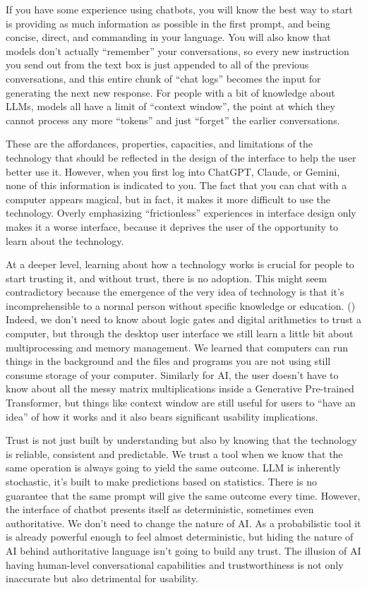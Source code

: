 \documentclass[12pt]{article}
\begin{document}
If you have some experience using chatbots, you will know the best way to start is providing as much information as possible in the first prompt, and being concise, direct, and commanding in your language. You will also know that models don't actually ``remember'' your conversations, so every new instruction you send out from the text box is just appended to all of the previous conversations, and this entire chunk of ``chat logs'' becomes the input for generating the next new response. For people with a bit of knowledge about LLMs, models all have a limit of ``context window'', the point at which they cannot process any more ``tokens'' and just ``forget'' the earlier conversations.

These are the affordances, properties, capacities, and limitations of the technology that should be reflected in the design of the interface to help the user better use it. However, when you first log into ChatGPT, Claude, or Gemini, none of this information is indicated to you. The fact that you can chat with a computer appears magical, but in fact, it makes it more difficult to use the technology. Overly emphasizing ``frictionless'' experiences in interface design only makes it a worse interface, because it deprives the user of the opportunity to learn about the technology.

At a deeper level, learning about how a technology works is crucial for people to start trusting it, and without trust, there is no adoption. This might seem contradictory because the emergence of the very idea of technology is that it's incomprehensible to a normal person without specific knowledge or education. (\cite{10.1162/1526381043320741}) Indeed, we don't need to know about logic gates and digital arithmetics to trust a computer, but through the desktop user interface we still learn a little bit about multiprocessing and memory management. We learned that computers can run things in the background and the files and programs you are not using still consume storage of your computer. Similarly for AI, the user doesn't have to know about all the messy matrix multiplications inside a Generative Pre-trained Transformer, but things like context window are still useful for users to ``have an idea'' of how it works and it also bears significant usability implications.

Trust is not just built by understanding but also by knowing that the technology is reliable, consistent and predictable. We trust a tool when we know that the same operation is always going to yield the same outcome. LLM is inherently stochastic, it's built to make predictions based on statistics. There is no guarantee that the same prompt will give the same outcome every time. However, the interface of chatbot presents itself as deterministic, sometimes even authoritative. We don't need to change the nature of AI. As a probabilistic tool it is already powerful enough to feel almost deterministic, but hiding the nature of AI behind authoritative language isn't going to build any trust. The illusion of AI having human-level conversational capabilities and trustworthiness is not only inaccurate but also detrimental for usability.
\end{document}
